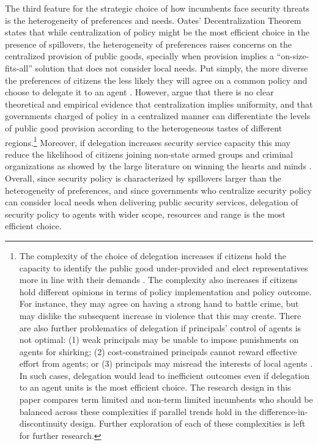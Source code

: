 \documentclass[12pt]{amsart}
\numberwithin{equation}{section}
\theoremstyle{definition}
\theoremstyle{definition}
\theoremstyle{definition}
\begin{document}
The third feature for the strategic choice of how incumbents face security threats is the heterogeneity of preferences and needs. Oates' \citeyear{oates_1972} Decentralization Theorem states that while centralization of policy might be the most efficient choice in the presence of spillovers, the heterogeneity of preferences raises concerns on the centralized provision of public goods, specially when provision implies a ``on-size-fits-all'' solution that does not consider local needs. Put simply, the more diverse the preferences of citizens the less likely they will agree on a common policy and choose to delegate it to an agent \citep{martin_2006, lyne_etal_2006}. However, \citet{besley_coate_2003} argue that there is no clear theoretical and empirical evidence that centralization implies uniformity, and that governments charged of policy in a centralized manner can differentiate the levels of public good provision according to the heterogeneous tastes of different regions.\footnote{The complexity of the choice of delegation increases if citizens hold the capacity to identify the public good under-provided and elect representatives more in line with their demands \citet{besley_coate_2003}. The complexity also increases if citizens hold different opinions in terms of policy implementation and policy outcome. For instance, they may agree on having a strong hand to battle crime, but may dislike the subsequent increase in violence that this may create. There are also further problematics of delegation if principals' control of agents is not optimal: (1) weak principals may be unable to impose punishments on agents for shirking; (2) cost-constrained principals cannot reward effective effort from agents; or (3) principals may misread the interests of local agents \citep{berman_lake_2019}. In such cases, delegation would lead to inefficient outcomes even if delegation to an agent units is the most efficient choice. The research design in this paper compares term limited and non-term limited incumbents who should be balanced across these complexities if parallel trends hold in the difference-in-discontinuity design. Further exploration of each of these complexities is left for further research.} Moreover, if delegation increases security service capacity this may reduce the likelihood of citizens joining non-state armed groups and criminal organizations as showed by the large literature on winning the hearts and minds \citep{beath_etal_2013, berman_etal_2011, dell_querubin_2018}. Overall, since security policy is characterized by  spillovers larger than the heterogeneity of preferences, and since governments who centralize security policy can consider local needs when delivering public security services, delegation of security policy to agents with wider scope, resources and range is the most efficient choice. 
\end{document}
